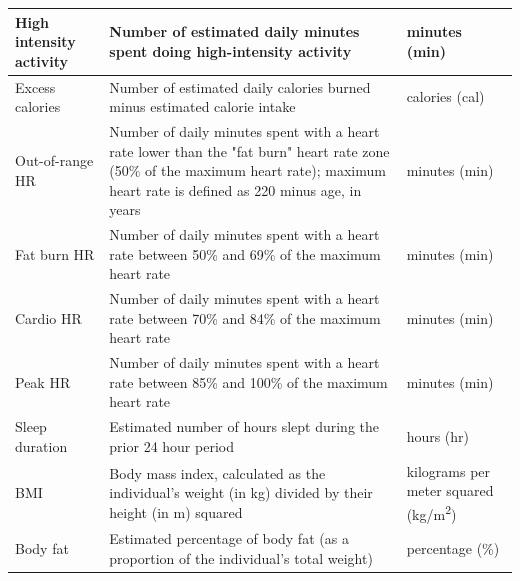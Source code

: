 \documentclass[10pt]{article}
\begin{document}
\begin{table}[]
{\begin{tabular}{p{1.5in}p{4in}p{1.5in}}
  \hline
High intensity activity & Number of estimated daily minutes spent doing high-intensity activity                                                                                                                & minutes (min)                            \\
  \hline
Excess calories         & Number of estimated daily calories burned minus estimated calorie intake                                                                                                             & calories (cal)                           \\
  \hline
Out-of-range HR         & Number of daily minutes spent with a heart rate lower than the "fat burn" heart rate zone (50\% of the maximum heart rate); maximum heart rate is defined as 220 minus age, in years & minutes (min)                            \\
  \hline
Fat burn HR             & Number of daily minutes spent with a heart rate between 50\% and 69\% of the maximum heart rate                                                                                      & minutes (min)                            \\
  \hline
Cardio HR               & Number of daily minutes spent with a heart rate between 70\% and 84\% of the maximum heart rate                                                                                      & minutes (min)                            \\
  \hline
Peak HR                 & Number of daily minutes spent with a heart rate between 85\% and 100\% of the maximum heart rate                                                                                     & minutes (min)                            \\
  \hline
Sleep duration          & Estimated number of hours slept during the prior 24 hour period                                                                                                                      & hours (hr)                               \\
  \hline
BMI                     & Body mass index, calculated as the
                          individual's weight (in kg) divided by their
                          height (in m) squared
  & kilograms per meter squared (kg/m\textsuperscript{2}) \\
  \hline
Body fat                & Estimated percentage of body fat (as a proportion of the individual's total weight)                                                                                                  & percentage (\%)                          \\

\end{tabular}}
\end{table}
\end{document}
